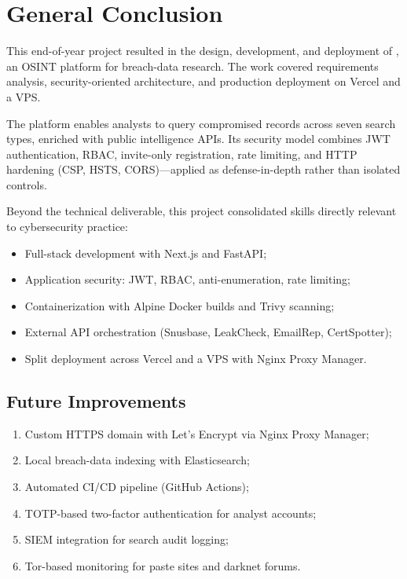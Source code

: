 \chapter*{General Conclusion}

This end-of-year project resulted in the design, development, and deployment
of \leaklens{}, an OSINT platform for breach-data research. The work covered
requirements analysis, security-oriented architecture, and production
deployment on Vercel and a VPS.

The platform enables analysts to query compromised records across seven search
types, enriched with public intelligence APIs. Its security model combines
JWT authentication, RBAC, invite-only registration, rate limiting, and HTTP
hardening (CSP, HSTS, CORS)---applied as defense-in-depth rather than isolated
controls.

Beyond the technical deliverable, this project consolidated skills directly
relevant to cybersecurity practice:

\begin{itemize}[nosep]
  \item Full-stack development with Next.js and FastAPI;
  \item Application security: JWT, RBAC, anti-enumeration, rate limiting;
  \item Containerization with Alpine Docker builds and Trivy scanning;
  \item External API orchestration (Snusbase, LeakCheck, EmailRep, CertSpotter);
  \item Split deployment across Vercel and a VPS with Nginx Proxy Manager.
\end{itemize}

\section*{Future Improvements}

\begin{enumerate}[nosep]
  \item Custom HTTPS domain with Let's Encrypt via Nginx Proxy Manager;
  \item Local breach-data indexing with Elasticsearch;
  \item Automated CI/CD pipeline (GitHub Actions);
  \item TOTP-based two-factor authentication for analyst accounts;
  \item SIEM integration for search audit logging;
  \item Tor-based monitoring for paste sites and darknet forums.
\end{enumerate}

